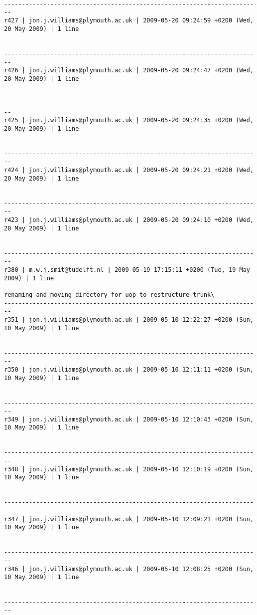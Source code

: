 \documentclass[9]{report}
\begin{document}
\begin{description}
\begin{verbatim}
------------------------------------------------------------------------
r427 | jon.j.williams@plymouth.ac.uk | 2009-05-20 09:24:59 +0200 (Wed, 20 May 2009) | 1 line


------------------------------------------------------------------------
r426 | jon.j.williams@plymouth.ac.uk | 2009-05-20 09:24:47 +0200 (Wed, 20 May 2009) | 1 line


------------------------------------------------------------------------
r425 | jon.j.williams@plymouth.ac.uk | 2009-05-20 09:24:35 +0200 (Wed, 20 May 2009) | 1 line


------------------------------------------------------------------------
r424 | jon.j.williams@plymouth.ac.uk | 2009-05-20 09:24:21 +0200 (Wed, 20 May 2009) | 1 line


------------------------------------------------------------------------
r423 | jon.j.williams@plymouth.ac.uk | 2009-05-20 09:24:10 +0200 (Wed, 20 May 2009) | 1 line


------------------------------------------------------------------------
r380 | m.w.j.smit@tudelft.nl | 2009-05-19 17:15:11 +0200 (Tue, 19 May 2009) | 1 line

renaming and moving directory for uop to restructure trunk\
------------------------------------------------------------------------
r351 | jon.j.williams@plymouth.ac.uk | 2009-05-10 12:22:27 +0200 (Sun, 10 May 2009) | 1 line


------------------------------------------------------------------------
r350 | jon.j.williams@plymouth.ac.uk | 2009-05-10 12:11:11 +0200 (Sun, 10 May 2009) | 1 line


------------------------------------------------------------------------
r349 | jon.j.williams@plymouth.ac.uk | 2009-05-10 12:10:43 +0200 (Sun, 10 May 2009) | 1 line


------------------------------------------------------------------------
r348 | jon.j.williams@plymouth.ac.uk | 2009-05-10 12:10:19 +0200 (Sun, 10 May 2009) | 1 line


------------------------------------------------------------------------
r347 | jon.j.williams@plymouth.ac.uk | 2009-05-10 12:09:21 +0200 (Sun, 10 May 2009) | 1 line


------------------------------------------------------------------------
r346 | jon.j.williams@plymouth.ac.uk | 2009-05-10 12:08:25 +0200 (Sun, 10 May 2009) | 1 line


------------------------------------------------------------------------


\end{verbatim}
\end{description}
\end{document}
